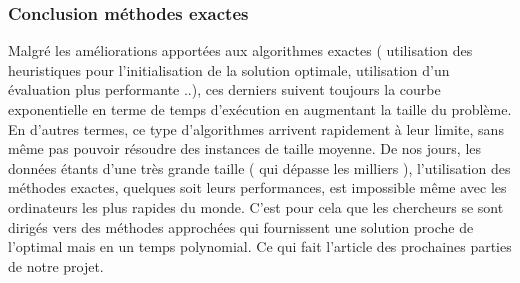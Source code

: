 \documentclass[12pt]{article}
\begin{document}
\subsubsection{Conclusion méthodes exactes}
Malgré les améliorations apportées aux algorithmes exactes ( utilisation des heuristiques pour l’initialisation de la solution optimale, utilisation d’un évaluation plus performante ..), ces derniers suivent toujours la courbe exponentielle en terme de temps d'exécution en augmentant la taille du problème. En d’autres termes, ce type d’algorithmes arrivent rapidement à leur limite, sans même pas pouvoir résoudre des instances de taille moyenne.
De nos jours, les données étants d’une très grande taille ( qui dépasse les milliers ), l’utilisation des méthodes exactes, quelques soit leurs performances, est impossible même avec les ordinateurs les plus rapides du monde. C’est pour cela que les chercheurs se sont dirigés vers des méthodes approchées qui fournissent une solution proche de l’optimal mais en un temps polynomial. Ce qui fait l’article des prochaines parties de notre projet.
\end{document}

